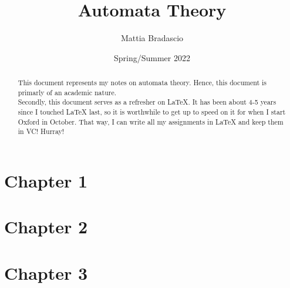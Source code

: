 \documentclass[12pt, letterpaper]{article}
\title{Automata Theory}
\author{Mattia Bradascio}
\date{Spring/Summer 2022}
\begin{document}
\begin{titlepage}
\maketitle
\end{titlepage}

\begin{abstract}

    This document represents my notes on automata theory.
    Hence, this document is primarly of an academic nature. \\ 
    \indent Secondly, this document serves as a refresher on LaTeX. 
    It has been about 4-5 years since I touched LaTeX last, so it is 
    worthwhile to get up to speed on it for when I start Oxford in October.
    That way, I can write all my assignments in LaTeX and keep them in VC! Hurray! \\
    

\end{abstract}

\section{Chapter 1}


\section{Chapter 2}


\section{Chapter 3}

\end{document}
